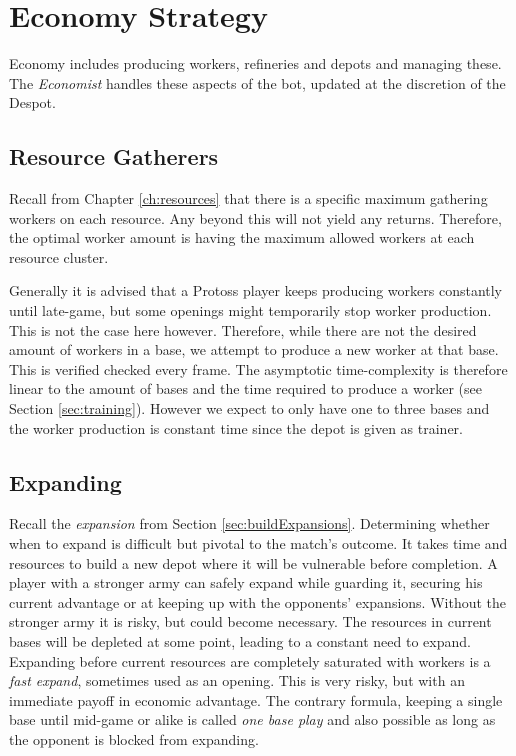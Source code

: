 \section{Economy Strategy}
Economy includes producing workers, refineries and depots and managing these. The \emph{Economist} handles these aspects of the bot, updated at the discretion of the Despot.

	\subsection*{Resource Gatherers}
	Recall from Chapter \ref{ch:resources} that there is a specific maximum gathering workers on each resource. Any beyond this will not yield any returns. Therefore, the optimal worker amount is having the maximum allowed workers at each resource cluster.
	
	Generally it is advised that a Protoss player keeps producing workers constantly until late-game, but some openings might temporarily stop worker production. This is not the case here however. Therefore, while there are not the desired amount of workers in a base, we attempt to produce a new worker at that base. This is verified checked every frame. The asymptotic time-complexity is therefore linear to the amount of bases and the time required to produce a worker (see Section \ref{sec:training}). However we expect to only have one to three bases and the worker production is constant time since the depot is given as trainer.
	
	\subsection*{Expanding}
	\label{sec:expanding}
	Recall the \emph{expansion} from Section \ref{sec:buildExpansions}. Determining whether when to expand is difficult but pivotal to the match's outcome. It takes time and resources to build a new depot where it will be vulnerable before completion. A player with a stronger army can safely expand while guarding it, securing his current advantage or at keeping up with the opponents' expansions. Without the stronger army it is risky, but could become necessary. The resources in current bases will be depleted at some point, leading to a constant need to expand. Expanding before current resources are completely saturated with workers is a \emph{fast expand}, sometimes used as an opening. This is very risky, but with an immediate payoff in economic advantage. The contrary formula, keeping a single base until mid-game or alike is called \emph{one base play} and also possible as long as the opponent is blocked from expanding.

